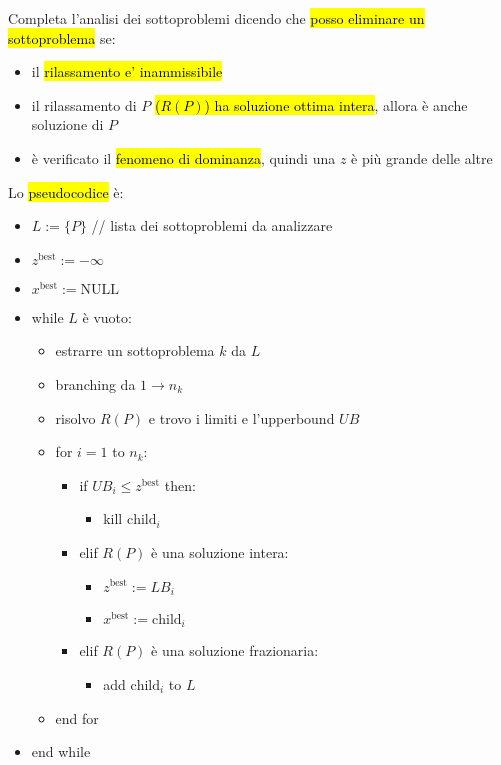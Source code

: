 Completa l'analisi dei sottoproblemi dicendo che \hl{posso eliminare un sottoproblema} se:

\begin{itemize}
    \item il \hl{rilassamento e' inammissibile}
    \item il rilassamento di $P$ \hl{($R(P)$) ha soluzione ottima intera}, allora è anche soluzione di $P$
    \item è verificato il \hl{fenomeno di dominanza}, quindi una $z$ è più grande delle altre
\end{itemize}

Lo \hl{pseudocodice} è:

\begin{itemize}
    \item[] $L := \{P\}$ // lista dei sottoproblemi da analizzare
    \item[] $z^{\text{best}} := -\infty$
    \item[] $x^{\text{best}} := \text{NULL}$
    \item[] while $L$ è vuoto:
    \begin{itemize}
        \item[] estrarre un sottoproblema $k$ da $L$
        \item[] branching da $1 \to n_k$
        \item[] risolvo $R(P)$ e trovo i limiti e l'upperbound $UB$
        \item[] for $i = 1$ to $n_k$:
        \begin{itemize}
            \item[] if $UB_i \leq z^{\text{best}}$ then:
            \begin{itemize}
                \item[] kill $\text{child}_i$
            \end{itemize}
            \item[] elif $R(P)$ è una soluzione intera:
            \begin{itemize}
                \item[] $z^{\text{best}} := LB_i$
                \item[] $x^{\text{best}} := \text{child}_i$
            \end{itemize}
            \item[] elif $R(P)$ è una soluzione frazionaria:
            \begin{itemize}
                \item[] add $\text{child}_i$ to $L$
            \end{itemize}
        \end{itemize}
        \item[] end for
    \end{itemize}
    \item[] end while
\end{itemize}


